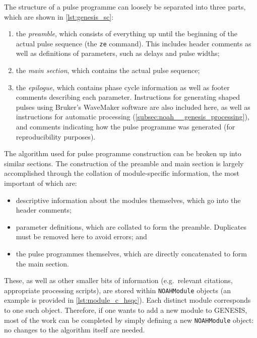 The structure of a pulse programme can loosely be separated into three parts, which are shown in \cref{lst:genesis_sc}:
\begin{enumerate}
    \item the \textit{preamble}, which consists of everything up until the beginning of the actual pulse sequence (the \texttt{ze} command). This includes header comments as well as definitions of parameters, such as delays and pulse widths;
    \item the \textit{main section}, which contains the actual pulse sequence;
    \item the \textit{epilogue}, which contains phase cycle information as well as footer comments describing each parameter. Instructions for generating shaped pulses using Bruker's WaveMaker software are also included here, as well as instructions for automatic processing (\cref{subsec:noah__genesis_processing}), and comments indicating how the pulse programme was generated (for reproducibility purposes).
\end{enumerate}

The algorithm used for pulse programme construction can be broken up into similar sections.
The construction of the preamble and main section is largely accomplished through the collation of module-specific information, the most important of which are:
\begin{itemize}
    \item descriptive information about the modules themselves, which go into the header comments;
    \item parameter definitions, which are collated to form the preamble. Duplicates must be removed here to avoid errors; and
    \item the pulse programmes themselves, which are directly concatenated to form the main section.
\end{itemize}
These, as well as other smaller bits of information (e.g.\ relevant citations, appropriate processing scripts), are stored within \texttt{NOAHModule} objects (an example is provided in \cref{lst:module_c_hsqc}).
Each distinct module corresponds to one such object.
Therefore, if one wants to add a new module to GENESIS, most of the work can be completed by simply defining a new \texttt{NOAHModule} object: no changes to the algorithm itself are needed.

